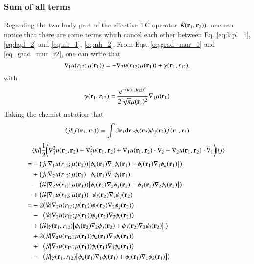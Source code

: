 \documentclass[aip,jcp,reprint,noshowkeys,superscriptaddress]{revtex4-1}
\newcommand{\matelem}[3]{\langle #1 | #2 | #3 \rangle}
\newcommand{\br}[0]{{\bf {r}}}
\newcommand{\bri}[1]{{\bf r}_{#1}}
\newcommand{\mur}[1]{\mu({\bf r_{#1}})}
\begin{document}
\subsubsection{Sum of all terms}
Regarding the two-body part of the effective TC operator $\hat{K}(\bri{1},\bri{2}) ) $, one can notice that there are some terms which cancel each other between Eq. \eqref{eq:lapl_1}, \eqref{eq:lapl_2} and \eqref{eq:nh_1}, \eqref{eq:nh_2}. 
From Eqs. \eqref{eq:grad_mur_1} and \eqref{eq_grad_mur_r2}, one can write that
\begin{equation}
 \nabla_1 u(r_{12};\mur{1})  = - \nabla_2 u(r_{12};\mur{1}) + {\bf {\gamma}}(\br_1, r_{12}), 
\end{equation}
with 
\begin{equation}
 {\bf {\gamma}}(\br_1, r_{12}) = \frac{e^{-(\mu(\bri{1}) r_{12})^2}}{2 \sqrt{\pi} \mu(\bri{1})^2} \nabla_1{\mur{1}}
\end{equation}
Taking the chemist notation that
\begin{equation}
 \big(jl|f(\br_1,\br_2) \big) = \int \text{d}\br_{1} \text{d}\br_{2} \phi_l(\br_2) \phi_j(\br_2) f(\br_1,\br_2) 
\end{equation}
\begin{equation}
 \begin{aligned}
& \matelem{kl}{\frac{1}{2}\bigg( \nabla_1^2 u(\bri{1},\bri{2}) + \nabla_2^2u(\bri{1},\bri{2}) + \nabla_1 u(\bri{1},\bri{2}) \cdot \nabla_2 + \nabla_2 u(\bri{1},\bri{2}) \cdot \nabla_1 \bigg)}{ij} \\
 =& -\big(jl| \nabla_1 u(r_{12};\mur{1}) \big[ \phi_k(\br_1) \nabla_1 \phi_i(\br_1) + \phi_i(\br_1)\nabla_1 \phi_k(\br_1)\big] \big) \\
 &  +\big(jl| \nabla_2 u(r_{12};\mur{1}  \,\, \,\,      \phi_k(\br_1) \nabla_1 \phi_i(\br_1) \\
 &  -\big(ik| \nabla_2 u(r_{12};\mur{1}) \big[ \phi_l(\br_2) \nabla_2 \phi_j(\br_2) + \phi_j(\br_2)\nabla_2 \phi_l(\br_2)\big] \big) \\
 &  +\big(ik| \nabla_1 u(r_{12};\mur{1}) \,\, \,\,      \phi_l(\br_2) \nabla_2 \phi_j(\br_2) \\
 =& -2     \big(ik|\nabla_2u(r_{12};\mur{1}) \phi_l(\br_2) \nabla_2 \phi_j(\br_2)\big) \\
  & -\,\,\,\big(ik|\nabla_2u(r_{12};\mur{1}) \phi_j(\br_2)\nabla_2 \phi_l(\br_2) \big) \\
  & +       \big(ik|{\bf {\gamma}}(\br_1, r_{12}) \big[ \phi_l(\br_2)\nabla_2 \phi_j(\br_2) + \phi_j(\br_2)\nabla_2 \phi_l(\br_2) \big] \big) \\
  & +2      \big(jl|\nabla_2 u(r_{12};\mur{1}) \phi_k(\br_1) \nabla_1 \phi_i(\br_1) \big) \\
  & + \,\,\,\big(jl|\nabla_2 u(r_{12};\mur{1}) \phi_i(\br_1) \nabla_1 \phi_k(\br_1) \big) \\
  & - \,\,\,\big(jl|{\bf {\gamma}}(\br_1, r_{12}) \big[ \phi_k(\br_1) \nabla_1 \phi_i(\br_1) + \phi_i(\br_1) \nabla_1 \phi_k(\br_1) \big] \big)
 \end{aligned}
\end{equation}
\end{document}
